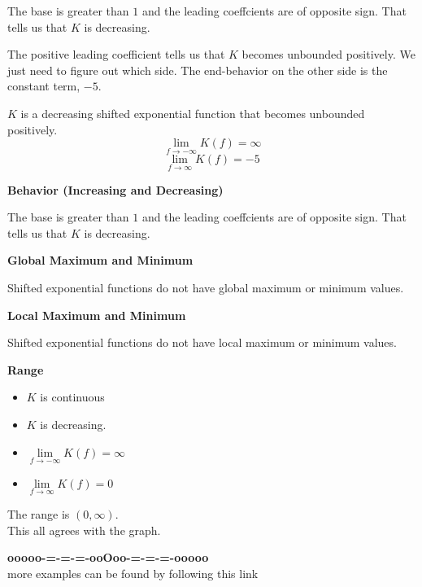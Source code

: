 \documentclass{ximera}
\begin{document}
\begin{example}
The base is greater than $1$ and the leading coeffcients are of opposite sign.  That tells us that $K$ is decreasing.

The positive leading coefficient tells us that $K$ becomes unbounded positively. We just need to figure out which side.  The end-behavior on the other side is the constant term, $-5$.


$K$ is a decreasing shifted exponential function that becomes unbounded positively. \\


\[ \lim\limits_{f \to -\infty} K(f) = \infty \]
\[ \lim\limits_{f \to \infty} K(f) = -5 \]



\textbf{Behavior (Increasing and Decreasing)}


The base is greater than $1$ and the leading coeffcients are of opposite sign.  That tells us that $K$ is decreasing.



\textbf{Global Maximum and Minimum}

Shifted exponential functions do not have global maximum or minimum values.





\textbf{Local Maximum and Minimum}

Shifted exponential functions do not have local maximum or minimum values.



\textbf{Range}

\begin{itemize}
\item $K$ is continuous
\item $K$ is decreasing.
\item $\lim\limits_{f \to -\infty} K(f) = \infty $
\item $\lim\limits_{f \to \infty} K(f) = 0$
\end{itemize}


The range is $(0, \infty)$. \\







This all agrees with the graph. \\




\end{example}
















\begin{center}
\textbf{\textcolor{green!50!black}{ooooo-=-=-=-ooOoo-=-=-=-ooooo}} \\

more examples can be found by following this link\\ 

\end{center}
\end{document}
